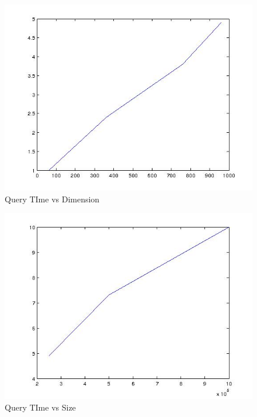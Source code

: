 \documentclass[10pt]{extarticle}
\begin{document}
\begin{figure}[h]
\centering
\includegraphics[scale=0.25]{Dim_Speed}
\caption{Query TIme vs Dimension}
\end{figure}


\begin{figure}[h]
\centering
\includegraphics[scale=0.25]{size_speed}
\caption{Query TIme vs Size}
\end{figure}
\end{document}
